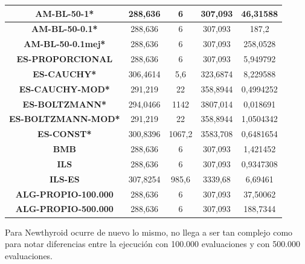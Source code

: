 \documentclass[12pt, spanish]{article}
\begin{document}
\begin{table}[H]
\begin{tabular}{|c|c|c|c|c|}
\textbf{AM-BL-50-1*}        & 288,636                   & 6                           & 307,093                & 46,31588   \\ \hline
\textbf{AM-BL-50-0.1*}      & 288,636                   & 6                           & 307,093                & 187,2      \\ \hline
\textbf{AM-BL-50-0.1mej*}   & 288,636                   & 6                           & 307,093                & 258,0528   \\ \hline
\textbf{ES-PROPORCIONAL}    & 288,636                   & 6                           & 307,093                & 5,949792   \\ \hline
\textbf{ES-CAUCHY*}         & 306,4614                  & 5,6                         & 323,6874               & 8,229588   \\ \hline
\textbf{ES-CAUCHY-MOD*}     & 291,219                   & 22                          & 358,8944               & 0,4994252  \\ \hline
\textbf{ES-BOLTZMANN*}      & 294,0466                  & 1142                        & 3807,014               & 0,018691   \\ \hline
\textbf{ES-BOLTZMANN-MOD*}  & 291,219                   & 22                          & 358,8944               & 1,0504342  \\ \hline
\textbf{ES-CONST*}          & 300,8396                  & 1067,2                      & 3583,708               & 0,6481654  \\ \hline
\textbf{BMB}                & 288,636                   & 6                           & 307,093                & 1,421452   \\ \hline
\textbf{ILS}                & 288,636                   & 6                           & 307,093                & 0,9347308  \\ \hline
\textbf{ILS-ES}             & 307,8254                  & 985,6                       & 3339,68                & 6,69461    \\ \hline
\textbf{ALG-PROPIO-100.000} & 288,636                   & 6                           & 307,093                & 37,50062   \\ \hline
\textbf{ALG-PROPIO-500.000} & 288,636                   & 6                           & 307,093                & 188,7344   \\ \hline
\end{tabular}
\end{table}


Para Newthyroid ocurre de nuevo lo mismo, no llega a ser tan complejo como para notar diferencias entre la ejecución con 100.000 evaluaciones y con 500.000 evaluaciones.
\end{document}
